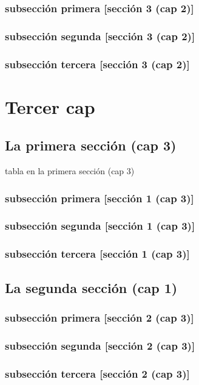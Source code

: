 \documentclass[12pt,a4paper]{report}
\begin{document}
\subsection{subsección primera [sección 3 (cap 2)]}
\subsection{subsección segunda [sección 3 (cap 2)]}
\subsection{subsección tercera [sección 3 (cap 2)]}

\chapter{Tercer cap}
\section{La primera sección (cap 3)}
\begin{table}[H]
\caption{tabla en la primera sección (cap 3)}
\end{table}
\subsection{subsección primera [sección 1 (cap 3)]}
\subsection{subsección segunda [sección 1 (cap 3)]}
\subsection{subsección tercera [sección 1 (cap 3)]}
\section{La segunda sección (cap 1)}
\subsection{subsección primera [sección 2 (cap 3)]}
\subsection{subsección segunda [sección 2 (cap 3)]}
\subsection{subsección tercera [sección 2 (cap 3)]}
\end{document}
